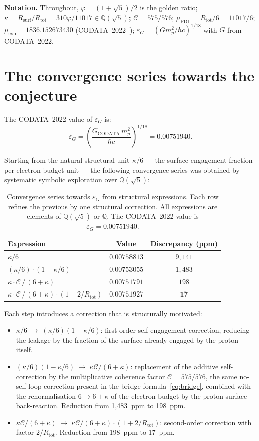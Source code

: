 \documentclass[11pt,a4paper]{article}
\theoremstyle{definition}
\newcommand{\Rsurf}{R_{\mathrm{surf}}}
\newcommand{\Rtot}{R_{\mathrm{tot}}}
\newcommand{\epsg}{\varepsilon_G}
\newcommand{\calC}{\mathcal{C}}
\newcommand{\vp}{\varphi}
\newcommand{\kap}{\kappa}
\newcommand{\muPDL}{\mu_{\mathrm{PDL}}}
\newcommand{\muexp}{\mu_{\mathrm{exp}}}
\begin{document}
\medskip\noindent\textbf{Notation.} Throughout, $\vp = (1+\sqrt{5})/2$ is the golden ratio; $\kap = \Rsurf/\Rtot = 310\vp/11017 \in \mathbb{Q}(\sqrt{5})$; $\calC = 575/576$; $\muPDL = \Rtot/6 = 11017/6$; $\muexp = 1836.152673430$ (CODATA~2022~\cite{CODATA_2022}); $\epsg = (Gm_p^2/\hbar c)^{1/18}$ with $G$ from CODATA~2022.

\section{The convergence series towards the conjecture}
\label{sec:convergence}

The CODATA~2022 value of $\epsg$ is:
\begin{equation}
\label{eq:eps_codata}
\epsg = \left(\frac{G_{\mathrm{CODATA}}\,m_p^2}{\hbar c}\right)^{1/18} = 0.00751940.
\end{equation}

Starting from the natural structural unit $\kap/6$ --- the surface engagement fraction per electron-budget unit --- the following convergence series was obtained by systematic symbolic exploration over $\mathbb{Q}(\sqrt{5})$:

\begin{table}[ht]
\centering
\caption{Convergence series towards $\epsg$ from structural expressions. Each row refines the previous by one structural correction. All expressions are elements of $\mathbb{Q}(\sqrt{5})$ or $\mathbb{Q}$. The CODATA~2022 value is $\epsg = 0.00751940$.}
\label{tab:convergence}
\bigskip
\begin{tabular}{p{5.8cm}cc}
\toprule
Expression & Value & Discrepancy (ppm) \\
\midrule
$\kap/6$ & $0.00758813$ & $9{,}141$ \\
$(\kap/6)\cdot(1-\kap/6)$ & $0.00753055$ & $1{,}483$ \\
$\kap\cdot\calC\,/\,(6+\kap)$ & $0.00751791$ & $198$ \\
$\kap\cdot\calC\,/\,(6+\kap)\cdot(1+2/\Rtot)$ & $0.00751927$ & $\mathbf{17}$ \\
\bottomrule
\end{tabular}
\end{table}

Each step introduces a correction that is structurally motivated:
\begin{itemize}
\item $\kap/6 \;\to\; (\kap/6)(1-\kap/6)$: first-order self-engagement correction, reducing the leakage by the fraction of the surface already engaged by the proton itself.
\item $(\kap/6)(1-\kap/6) \;\to\; \kap\calC/(6+\kap)$: replacement of the additive self-correction by the multiplicative coherence factor $\calC = 575/576$, the same no-self-loop correction present in the bridge formula~\eqref{eq:bridge}, combined with the renormalisation $6 \to 6+\kap$ of the electron budget by the proton surface back-reaction. Reduction from 1{,}483~ppm to 198~ppm.
\item $\kap\calC/(6+\kap) \;\to\; \kap\calC/(6+\kap)\cdot(1+2/\Rtot)$: second-order correction with factor $2/\Rtot$. Reduction from 198~ppm to 17~ppm.
\end{itemize}
\end{document}
